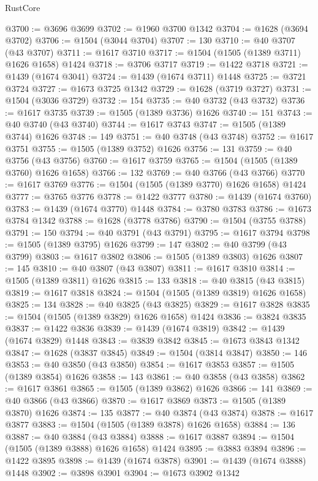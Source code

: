 \begin{lexlean}{RustCore}
\begin{coremodule}
@3700 := @3696 @3699
@3702 := @1960 @3700 @1342
@3704 := @1628 (@3694 @3702)
@3706 := @1504 (@3044 @3704)
@3707 := 130
@3710 := @40 @3707 (@43 @3707)
@3711 := @1617 @3710
@3717 := @1504 (@1505 (@1389 @3711) @1626 @1658) @1424
@3718 := @3706 @3717
@3719 := @1422 @3718
@3721 := @1439 (@1674 @3041)
@3724 := @1439 (@1674 @3711) @1448
@3725 := @3721 @3724
@3727 := @1673 @3725 @1342
@3729 := @1628 (@3719 @3727)
@3731 := @1504 (@3036 @3729)
@3732 := 154
@3735 := @40 @3732 (@43 @3732)
@3736 := @1617 @3735
@3739 := @1505 (@1389 @3736) @1626
@3740 := 151
@3743 := @40 @3740 (@43 @3740)
@3744 := @1617 @3743
@3747 := @1505 (@1389 @3744) @1626
@3748 := 149
@3751 := @40 @3748 (@43 @3748)
@3752 := @1617 @3751
@3755 := @1505 (@1389 @3752) @1626
@3756 := 131
@3759 := @40 @3756 (@43 @3756)
@3760 := @1617 @3759
@3765 := @1504 (@1505 (@1389 @3760) @1626 @1658)
@3766 := 132
@3769 := @40 @3766 (@43 @3766)
@3770 := @1617 @3769
@3776 := @1504 (@1505 (@1389 @3770) @1626 @1658) @1424
@3777 := @3765 @3776
@3778 := @1422 @3777
@3780 := @1439 (@1674 @3760)
@3783 := @1439 (@1674 @3770) @1448
@3784 := @3780 @3783
@3786 := @1673 @3784 @1342
@3788 := @1628 (@3778 @3786)
@3790 := @1504 (@3755 @3788)
@3791 := 150
@3794 := @40 @3791 (@43 @3791)
@3795 := @1617 @3794
@3798 := @1505 (@1389 @3795) @1626
@3799 := 147
@3802 := @40 @3799 (@43 @3799)
@3803 := @1617 @3802
@3806 := @1505 (@1389 @3803) @1626
@3807 := 145
@3810 := @40 @3807 (@43 @3807)
@3811 := @1617 @3810
@3814 := @1505 (@1389 @3811) @1626
@3815 := 133
@3818 := @40 @3815 (@43 @3815)
@3819 := @1617 @3818
@3824 := @1504 (@1505 (@1389 @3819) @1626 @1658)
@3825 := 134
@3828 := @40 @3825 (@43 @3825)
@3829 := @1617 @3828
@3835 := @1504 (@1505 (@1389 @3829) @1626 @1658) @1424
@3836 := @3824 @3835
@3837 := @1422 @3836
@3839 := @1439 (@1674 @3819)
@3842 := @1439 (@1674 @3829) @1448
@3843 := @3839 @3842
@3845 := @1673 @3843 @1342
@3847 := @1628 (@3837 @3845)
@3849 := @1504 (@3814 @3847)
@3850 := 146
@3853 := @40 @3850 (@43 @3850)
@3854 := @1617 @3853
@3857 := @1505 (@1389 @3854) @1626
@3858 := 143
@3861 := @40 @3858 (@43 @3858)
@3862 := @1617 @3861
@3865 := @1505 (@1389 @3862) @1626
@3866 := 141
@3869 := @40 @3866 (@43 @3866)
@3870 := @1617 @3869
@3873 := @1505 (@1389 @3870) @1626
@3874 := 135
@3877 := @40 @3874 (@43 @3874)
@3878 := @1617 @3877
@3883 := @1504 (@1505 (@1389 @3878) @1626 @1658)
@3884 := 136
@3887 := @40 @3884 (@43 @3884)
@3888 := @1617 @3887
@3894 := @1504 (@1505 (@1389 @3888) @1626 @1658) @1424
@3895 := @3883 @3894
@3896 := @1422 @3895
@3898 := @1439 (@1674 @3878)
@3901 := @1439 (@1674 @3888) @1448
@3902 := @3898 @3901
@3904 := @1673 @3902 @1342

\end{coremodule}
\end{lexlean}
